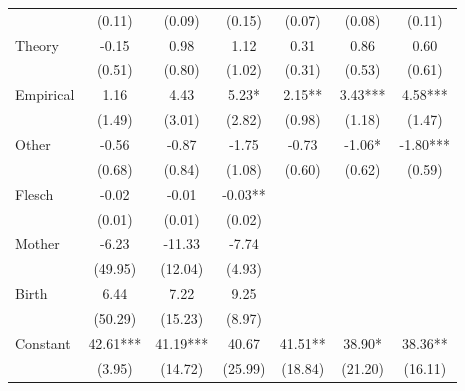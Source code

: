 \begin{table}[H]
\begin{threeparttable}
\begin{tabular}{p{3.78cm}S@{}S@{}S@{}S@{}S@{}S@{}}
                                          &      (0.11)   &      (0.09)   &      (0.15)   &      (0.07)   &      (0.08)   &      (0.11)   \\
            Theory                        &       -0.15   &        0.98   &        1.12   &        0.31   &        0.86   &        0.60   \\
                                          &      (0.51)   &      (0.80)   &      (1.02)   &      (0.31)   &      (0.53)   &      (0.61)   \\
            Empirical                     &        1.16   &        4.43   &        5.23*  &        2.15** &        3.43***&        4.58***\\
                                          &      (1.49)   &      (3.01)   &      (2.82)   &      (0.98)   &      (1.18)   &      (1.47)   \\
            Other                         &       -0.56   &       -0.87   &       -1.75   &       -0.73   &       -1.06*  &       -1.80***\\
                                          &      (0.68)   &      (0.84)   &      (1.08)   &      (0.60)   &      (0.62)   &      (0.59)   \\
            Flesch                        &       -0.02   &       -0.01   &       -0.03** &               &               &               \\
                                          &      (0.01)   &      (0.01)   &      (0.02)   &               &               &               \\
            Mother                        &       -6.23   &      -11.33   &       -7.74   &               &               &               \\
                                          &     (49.95)   &     (12.04)   &      (4.93)   &               &               &               \\
            Birth                         &        6.44   &        7.22   &        9.25   &               &               &               \\
                                          &     (50.29)   &     (15.23)   &      (8.97)   &               &               &               \\
            Constant                      &       42.61***&       41.19***&       40.67   &       41.51** &       38.90*  &       38.36** \\
                                          &      (3.95)   &     (14.72)   &     (25.99)   &     (18.84)   &     (21.20)   &     (16.11)   \\

\end{tabular}
\end{threeparttable}
\end{table}

